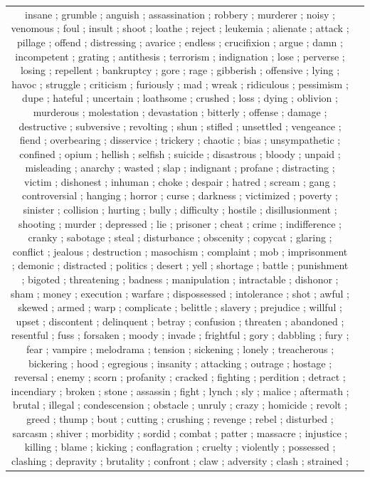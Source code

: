 \documentclass[11pt]{article}
\begin{document}
\begin{table}[th]
\begin{center}
\begin{tabular}{c @{\hspace{0pt}}  @{\hspace{15pt}}p{}}
insane	;
grumble	;
anguish	;
assassination	;
robbery	;
murderer	;
noisy	;
venomous	;
foul	;
insult	;
shoot	;
loathe	;
reject	;
leukemia	;
alienate	;
attack	;
pillage	;
offend	;
distressing	;
avarice	;
endless	;
crucifixion	;
argue	;
damn	;
incompetent	;
grating	;
antithesis	;
terrorism	;
indignation	;
lose	;
perverse	;
losing	;
repellent	;
bankruptcy	;
gore	;
rage	;
gibberish	;
offensive	;
lying	;
havoc	;
struggle	;
criticism	;
furiously	;
mad	;
wreak	;
ridiculous	;
pessimism	;
dupe	;
hateful	;
uncertain	;
loathsome	;
crushed	;
loss	;
dying	;
oblivion	;
murderous	;
molestation	;
devastation	;
bitterly	;
offense	;
damage	;
destructive	;
subversive	;
revolting	;
shun	;
stifled	;
unsettled	;
vengeance	;
fiend	;
overbearing	;
disservice	;
trickery	;
chaotic	;
bias	;
unsympathetic	;
confined	;
opium	;
hellish	;
selfish	;
suicide	;
disastrous	;
bloody	;
unpaid	;
misleading	;
anarchy	;
wasted	;
slap	;
indignant	;
profane	;
distracting	;
victim	;
dishonest	;
inhuman	;
choke	;
despair	;
hatred	;
scream	;
gang	;
controversial	;
hanging	;
horror	;
curse	;
darkness	;
victimized	;
poverty	;
sinister	;
collision	;
hurting	;
bully	;
difficulty	;
hostile	;
disillusionment	;
shooting	;
murder	;
depressed	;
lie	;
prisoner	;
cheat	;
crime	;
indifference	;
cranky	;
sabotage	;
steal	;
disturbance	;
obscenity	;
copycat	;
glaring	;
conflict	;
jealous	;
destruction	;
masochism	;
complaint	;
mob	;
imprisonment	;
demonic	;
distracted	;
politics	;
desert	;
yell	;
shortage	;
battle	;
punishment	;
bigoted	;
threatening	;
badness	;
manipulation	;
intractable	;
dishonor	;
sham	;
money	;
execution	;
warfare	;
dispossessed	;
intolerance	;
shot	;
awful	;
skewed	;
armed	;
warp	;
complicate	;
belittle	;
slavery	;
prejudice	;
willful	;
upset	;
discontent	;
delinquent	;
betray	;
confusion	;
threaten	;
abandoned	;
resentful	;
fuss	;
forsaken	;
moody	;
invade	;
frightful	;
gory	;
dabbling	;
fury	;
fear	;
vampire	;
melodrama	;
tension	;
sickening	;
lonely	;
treacherous	;
bickering	;
hood	;
egregious	;
insanity	;
attacking	;
outrage	;
hostage	;
reversal	;
enemy	;
scorn	;
profanity	;
cracked	;
fighting	;
perdition	;
detract	;
incendiary	;
broken	;
stone	;
assassin	;
fight	;
lynch	;
sly	;
malice	;
aftermath	;
brutal	;
illegal	;
condescension	;
obstacle	;
unruly	;
crazy	;
homicide	;
revolt	;
greed	;
thump	;
bout	;
cutting	;
crushing	;
revenge	;
rebel	;
disturbed	;
sarcasm	;
shiver	;
morbidity	;
sordid	;
combat	;
patter	;
massacre	;
injustice	;
killing	;
blame	;
kicking	;
conflagration	;
cruelty	;
violently	;
possessed	;
clashing	;
depravity	;
brutality	;
confront	;
claw	;
adversity	;
clash	;
strained	;

\end{tabular}
\end{center}
\end{table}
\end{document}

